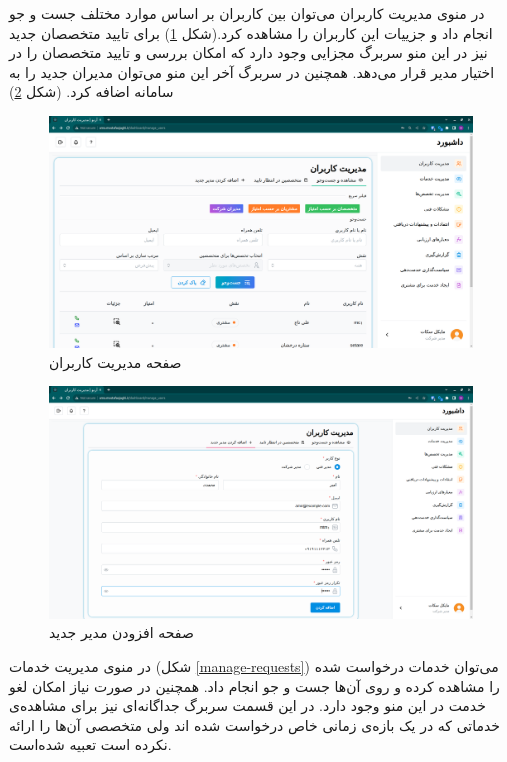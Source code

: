 \FloatBarrier

در منوی مدیریت کاربران می‌توان بین کاربران بر اساس موارد مختلف جست و جو انجام داد و جزییات این کاربران را مشاهده کرد.(شکل \ref{manage-users})
برای تایید متخصصان جدید نیز در این منو سربرگ مجزایی وجود دارد که امکان بررسی و تایید متخصصان را در اختیار مدیر قرار می‌دهد.
همچنین در سربرگ آخر این منو می‌توان مدیران جدید را به سامانه اضافه کرد. (شکل \ref{add-manager})

\begin{figure}[h]
	\centering
	\includegraphics[width=\textwidth]{figs/user-guide/cm-manage-users}
	\caption{صفحه مدیریت کاربران}
	\label{manage-users}
\end{figure}

\begin{figure}[h]
	\centering
	\includegraphics[width=\textwidth]{figs/user-guide/cm-add-manager}
	\caption{صفحه افزودن مدیر جدید}
	\label{add-manager}
\end{figure}

\FloatBarrier

در منوی مدیریت خدمات (شکل \ref{manage-requests}) می‌توان خدمات درخواست شده را مشاهده کرده و روی آن‌ها جست و جو انجام داد.
همچنین در صورت نیاز امکان لغو خدمت در این منو وجود دارد.
در این قسمت سربرگ جداگانه‌ای نیز برای مشاهده‌ی خدماتی که در یک بازه‌ی زمانی خاص درخواست شده اند ولی متخصصی آن‌ها را ارائه نکرده است تعبیه شده‌است.


